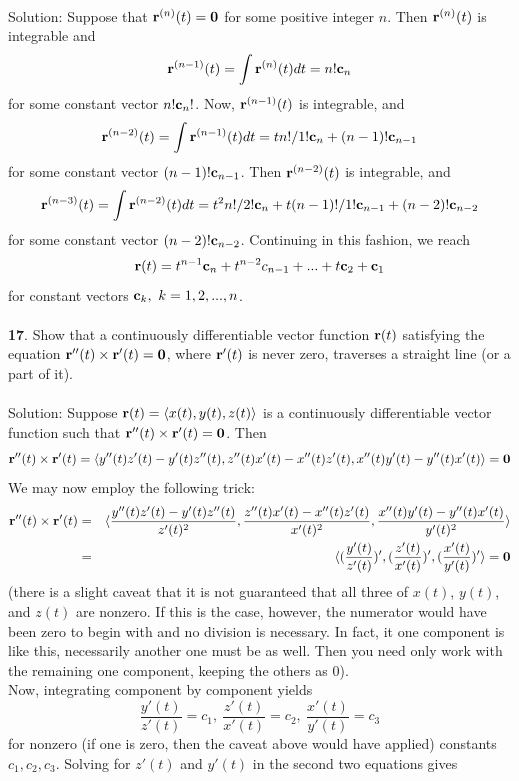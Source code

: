 \documentclass[12pt]{amsbook}
\newcommand{\la}{\langle}
\newcommand{\ra}{\rangle}
\begin{document}
\\
{\sc Solution}: Suppose that ${\bf r}^{(n)}(t)={\bf 0}$ for some positive integer $n$. Then ${\bf r}^{(n)}(t)$ is integrable and
$${\bf r}^{(n-1)}(t)=\int {\bf r}^{(n)}(t)dt= n!{\bf c}_n$$
for some constant vector $n!{\bf c}_n!$. Now, ${\bf r}^{(n-1)}(t)$ is integrable, and
$${\bf r}^{(n-2)}(t)=\int {\bf r}^{(n-1)}(t)dt = tn!/1!{\bf c}_n+(n-1)!{\bf c}_{n-1}$$
for some constant vector $(n-1)!{\bf c}_{n-1}$. Then  ${\bf r}^{(n-2)}(t)$ is integrable, and 
$${\bf r}^{(n-3)}(t)=\int {\bf r}^{(n-2)}(t)dt = t^2n!/2!{\bf c}_n+t(n-1)!/1!{\bf c}_{n-1}+(n-2)!{\bf c}_{n-2}$$
for some constant vector $(n-2)!{\bf c}_{n-2}$. Continuing in this fashion, we reach
$${\bf r}(t)=t^{n-1}{\bf c}_n+t^{n-2}c_{n-1}+...+t{\bf c}_2+{\bf c}_1$$
for constant vectors ${\bf c}_k, \ k=1,2,...,n$. 
\\
\\
{\small\bf 17}. Show that a continuously differentiable vector function ${\bf r}(t)$ satisfying the equation ${\bf r}''(t)\times{\bf r}'(t)={\bf 0}$, where ${\bf r}'(t)$ is never zero, traverses a straight line (or a part of it).
\\
\\
{\sc Solution}: Suppose ${\bf r}(t)=\la x(t),y(t),z(t)\ra$ is a continuously differentiable vector function such that ${\bf r}''(t)\times{\bf r}'(t)={\bf 0}$. Then 
$${\bf r}''(t)\times{\bf r}'(t)=\la y''(t)z'(t)-y'(t)z''(t),z''(t)x'(t)-x''(t)z'(t),x''(t)y'(t)-y''(t)x'(t)\ra = {\bf 0}$$
We may now employ the following trick:
\begin{eqnarray*}
{\bf r}''(t)\times{\bf r}'(t)&=&\la \frac{y''(t)z'(t)-y'(t)z''(t)}{z'(t)^2},\frac{z''(t)x'(t)-x''(t)z'(t)}{x'(t)^2},\frac{x''(t)y'(t)-y''(t)x'(t)}{y'(t)^2}\ra\\
& =& \la (\frac{y'(t)}{z'(t)})',(\frac{z'(t)}{x'(t)})',(\frac{x'(t)}{y'(t)})'\ra= {\bf 0}
\end{eqnarray*}
(there is a slight caveat that it is not guaranteed that all three of $x(t)$, $y(t)$, and $z(t)$ are nonzero. If this is the case, however, the numerator would have been zero to begin with and no division is necessary. In fact, it one component is like this, necessarily another one must be as well. Then you need only work with the remaining one component, keeping the others as 0). 
\\
Now, integrating component by component yields
$$\frac{y'(t)}{z'(t)}=c_1, \ \frac{z'(t)}{x'(t)}=c_2, \ \frac{x'(t)}{y'(t)}=c_3$$
for nonzero (if one is zero, then the caveat above would have applied) constants $c_1,c_2,c_3$. Solving for $z'(t)$ and $y'(t)$ in the second two equations gives
\end{document}
